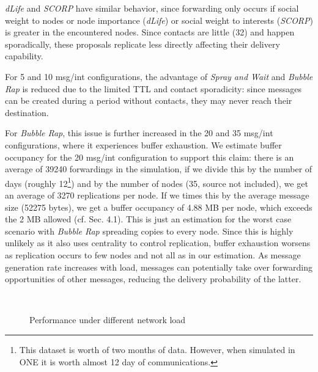 \documentclass[lnicst]{svmultln}
\begin{document}
\emph{dLife} and \emph{SCORP }have similar behavior, since forwarding
only occurs if social weight to nodes or node importance (\emph{dLife})
or social weight to interests (\emph{SCORP}) is greater in the encountered
nodes. Since contacts are little (32) and happen sporadically, these
proposals replicate less directly affecting their delivery capability.

For 5 and 10 msg/int configurations, the advantage of \emph{Spray
and Wait} and \emph{Bubble Rap} is reduced due to the limited TTL
and contact sporadicity: since messages can be created during a period
without contacts, they may never reach their destination.\emph{}

For \emph{Bubble Rap}, this issue is further increased in the 20 and
35 msg/int configurations, where it experiences buffer exhaustion.
We estimate buffer occupancy for the 20 msg/int configuration to support
this claim: there is an average of 39240 forwardings in the simulation,
if we divide this by the number of days (roughly 12\footnote{This dataset is worth of two months of data. However, when simulated
in ONE it is worth almost 12 day of communications. }) and by the number of nodes (35, source not included), we get an
average of 3270 replications per node. If we times this by the average
message size (52275 bytes), we get a buffer occupancy of 4.88 MB per
node, which exceeds the 2 MB allowed (cf. Sec. 4.1). This is just an
estimation for the worst case scenario with \emph{Bubble Rap} spreading
copies to every node. Since this is highly unlikely as\emph{ }it\emph{
}also uses centrality to control replication, buffer exhaustion worsens
as replication occurs to few nodes and not all as in our estimation.
As message generation rate increases with load, messages can potentially
take over forwarding opportunities of other messages, reducing the
delivery probability of the latter.

\begin{figure}
\vspace{-0.4cm}
~~~
\vspace{-0.3cm}
\caption{Performance under different network load}
\vspace{-0.4cm}
\end{figure}
\end{document}
